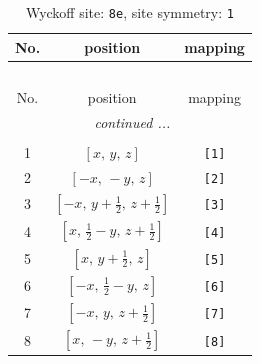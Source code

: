 \documentclass[fleqn,8pt]{jsarticle}
\begin{document}
\renewcommand{\arraystretch}{1.2}
\begin{longtable}{ccc}
\caption{Wyckoff site: {\tt 8e}, site symmetry: {\tt 1}}
 \\
 \hline \hline
No. & position & mapping \\ \hline \endfirsthead

\multicolumn{2}{l}{\tablename\ \thetable{}} \\
 \hline \hline
No. & position & mapping \\ \hline \endhead

 \hline \hline
\multicolumn{2}{r}{\footnotesize\it continued ...} \\ \endfoot

 \hline \hline
\multicolumn{2}{r}{} \\ \endlastfoot

1 & $\left[ x,\, y,\, z \right]$ & {\tt [1]} \\ \hline
2 & $\left[ - x,\, - y,\, z \right]$ & {\tt [2]} \\ \hline
3 & $\left[ - x,\, y + \frac{1}{2},\, z + \frac{1}{2} \right]$ & {\tt [3]} \\ \hline
4 & $\left[ x,\, \frac{1}{2} - y,\, z + \frac{1}{2} \right]$ & {\tt [4]} \\ \hline
5 & $\left[ x,\, y + \frac{1}{2},\, z \right]$ & {\tt [5]} \\ \hline
6 & $\left[ - x,\, \frac{1}{2} - y,\, z \right]$ & {\tt [6]} \\ \hline
7 & $\left[ - x,\, y,\, z + \frac{1}{2} \right]$ & {\tt [7]} \\ \hline
8 & $\left[ x,\, - y,\, z + \frac{1}{2} \right]$ & {\tt [8]} \\
\end{longtable}
\end{document}
